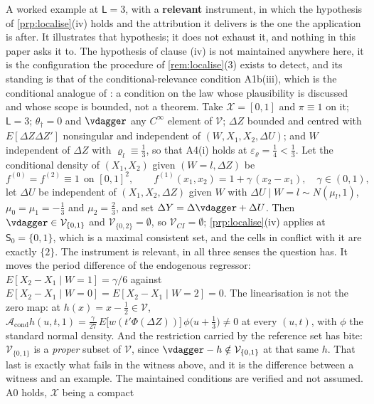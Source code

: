 A worked example at $\mathsf L=3$, with a \textbf{relevant} instrument, in which the
hypothesis of \cref{prp:localise}\textup{(iv)} holds and the attribution it delivers is the one the
application is after. It illustrates that hypothesis; it does not exhaust it, and nothing in this
paper asks it to. The hypothesis of clause \textup{(iv)} is not maintained anywhere here, it is the
configuration the procedure of \cref{rem:localise}\textup{(3)} exists to detect, and its standing is
that of the conditional-relevance condition A1b(iii), which is the conditional analogue of
\citet[Assumption~2.2]{centorrinofeveflorens2019}: a condition on the law whose plausibility is
discussed and whose scope is bounded, not a theorem. Take
$\mathcal X=[0,1]$ and $\pi\equiv1$ on it; $\mathsf L=3$; $\theta_\dagger=0$ and $\vdagger$ any
$C^{\infty}$ element of $\mathcal V$; $\Delta Z$ bounded and centred with $E[\Delta Z\Delta Z']$
nonsingular and independent of $(W,X_1,X_2,\Delta U)$; and $W$ independent of $\Delta Z$ with
$\varrho_l\equiv\tfrac13$, so that A4(i) holds at $\varepsilon_\varrho=\tfrac14<\tfrac13$. Let the
conditional density of $(X_1,X_2)$ given $(W=l,\Delta Z)$ be
\[
f^{(0)}=f^{(2)}\equiv1\ \ \text{on }[0,1]^{2},
\qquad
f^{(1)}(x_1,x_2)=1+\gamma\,(x_2-x_1),\quad\gamma\in(0,1),
\]
let $\Delta U$ be independent of $(X_1,X_2,\Delta Z)$ given $W$ with
$\Delta U\mid W=l\sim N(\mu_l,1)$, $\mu_0=\mu_1=-\tfrac13$ and $\mu_2=\tfrac23$, and set
$\Delta Y=\Delta\vdagger+\Delta U$. Then $\vdagger\in\mathcal V_{\{0,1\}}$ and
$\mathcal V_{\{0,2\}}=\emptyset$, so $\mathcal V_{CI}=\emptyset$;
\cref{prp:localise}\textup{(iv)} applies at $\mathsf S_0=\{0,1\}$, which is a maximal consistent set, and
the cells in conflict with it are exactly $\{2\}$.
The instrument is relevant, in all three senses the question has. It moves the period difference
of the endogenous regressor: $E[X_2-X_1\mid W=1]=\gamma/6$ against
$E[X_2-X_1\mid W=0]=E[X_2-X_1\mid W=2]=0$. The linearisation is not the zero map: at
$h(x)=x-\tfrac12\in\mathcal V$,
$\mathcal A_{\mathrm{cond}}h(u,t,1)=\tfrac{\gamma}{27}\,E\big[w(t'\Phi(\Delta Z))\big]\,\phi\big(u+\tfrac13\big)\neq0$
at every $(u,t)$, with $\phi$ the standard normal density. And the restriction carried by the reference
set has bite: $\mathcal V_{\{0,1\}}$ is a \emph{proper} subset of $\mathcal V$, since
$\vdagger-h\notin\mathcal V_{\{0,1\}}$ at that same $h$. That last is exactly what fails in the witness
above, and it is the difference between a witness and an example.
The maintained conditions are verified and not assumed. A0 holds, $\mathcal X$ being a compact
